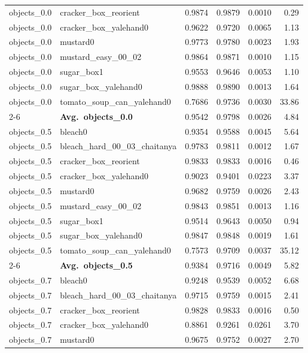 \begin{longtable}{llrrrr}
  objects_0.0 & cracker\_box\_reorient & 0.9874 & 0.9879 & 0.0010 & 0.29 \\
  objects_0.0 & cracker\_box\_yalehand0 & 0.9622 & 0.9720 & 0.0065 & 1.13 \\
  objects_0.0 & mustard0 & 0.9773 & 0.9780 & 0.0023 & 1.93 \\
  objects_0.0 & mustard\_easy\_00\_02 & 0.9864 & 0.9871 & 0.0010 & 1.15 \\
  objects_0.0 & sugar\_box1 & 0.9553 & 0.9646 & 0.0053 & 1.10 \\
  objects_0.0 & sugar\_box\_yalehand0 & 0.9888 & 0.9890 & 0.0013 & 1.64 \\
  objects_0.0 & tomato\_soup\_can\_yalehand0 & 0.7686 & 0.9736 & 0.0030 & 33.86 \\
  \cmidrule{2-6}
  & \textbf{Avg.~objects_0.0} & 0.9542 & 0.9798 & 0.0026 & 4.84 \\
  \midrule
  objects_0.5 & bleach0 & 0.9354 & 0.9588 & 0.0045 & 5.64 \\
  objects_0.5 & bleach\_hard\_00\_03\_chaitanya & 0.9783 & 0.9811 & 0.0012 & 1.67 \\
  objects_0.5 & cracker\_box\_reorient & 0.9833 & 0.9833 & 0.0016 & 0.46 \\
  objects_0.5 & cracker\_box\_yalehand0 & 0.9023 & 0.9401 & 0.0223 & 3.37 \\
  objects_0.5 & mustard0 & 0.9682 & 0.9759 & 0.0026 & 2.43 \\
  objects_0.5 & mustard\_easy\_00\_02 & 0.9843 & 0.9851 & 0.0013 & 1.16 \\
  objects_0.5 & sugar\_box1 & 0.9514 & 0.9643 & 0.0050 & 0.94 \\
  objects_0.5 & sugar\_box\_yalehand0 & 0.9847 & 0.9848 & 0.0019 & 1.61 \\
  objects_0.5 & tomato\_soup\_can\_yalehand0 & 0.7573 & 0.9709 & 0.0037 & 35.12 \\
  \cmidrule{2-6}
  & \textbf{Avg.~objects_0.5} & 0.9384 & 0.9716 & 0.0049 & 5.82 \\
  \midrule
  objects_0.7 & bleach0 & 0.9248 & 0.9539 & 0.0052 & 6.68 \\
  objects_0.7 & bleach\_hard\_00\_03\_chaitanya & 0.9715 & 0.9759 & 0.0015 & 2.41 \\
  objects_0.7 & cracker\_box\_reorient & 0.9828 & 0.9833 & 0.0016 & 0.50 \\
  objects_0.7 & cracker\_box\_yalehand0 & 0.8861 & 0.9261 & 0.0261 & 3.70 \\
  objects_0.7 & mustard0 & 0.9675 & 0.9752 & 0.0027 & 2.70 \\

\end{longtable}
